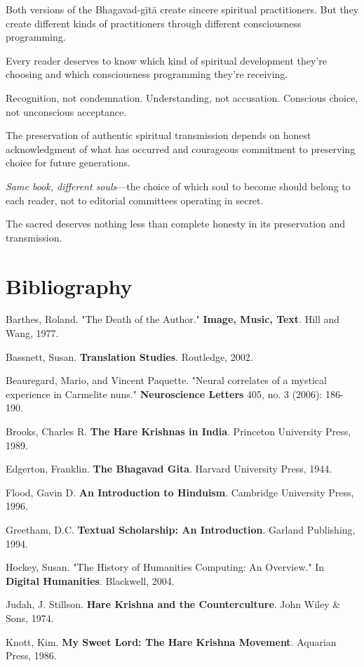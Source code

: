 \documentclass[11pt,twoside]{book}
\begin{document}
Both versions of the Bhagavad-gītā create sincere spiritual practitioners. But they create different kinds of practitioners through different consciousness programming.

Every reader deserves to know which kind of spiritual development they're choosing and which consciousness programming they're receiving.

Recognition, not condemnation. Understanding, not accusation. Conscious choice, not unconscious acceptance.

The preservation of authentic spiritual transmission depends on honest acknowledgment of what has occurred and courageous commitment to preserving choice for future generations.

\textit{Same book, different souls}—the choice of which soul to become should belong to each reader, not to editorial committees operating in secret.

The sacred deserves nothing less than complete honesty in its preservation and transmission.
\part*{Bibliography}
\label{sec:org284cc84}
\thispagestyle{plain}

Barthes, Roland. "The Death of the Author." \textbf{Image, Music, Text}. Hill and Wang, 1977.

Bassnett, Susan. \textbf{Translation Studies}. Routledge, 2002.

Beauregard, Mario, and Vincent Paquette. "Neural correlates of a mystical experience in Carmelite nuns." \textbf{Neuroscience Letters} 405, no. 3 (2006): 186-190.

Brooks, Charles R. \textbf{The Hare Krishnas in India}. Princeton University Press, 1989.

Edgerton, Franklin. \textbf{The Bhagavad Gita}. Harvard University Press, 1944.

Flood, Gavin D. \textbf{An Introduction to Hinduism}. Cambridge University Press, 1996.

Greetham, D.C. \textbf{Textual Scholarship: An Introduction}. Garland Publishing, 1994.

Hockey, Susan. "The History of Humanities Computing: An Overview." In \textbf{Digital Humanities}. Blackwell, 2004.

Judah, J. Stillson. \textbf{Hare Krishna and the Counterculture}. John Wiley \& Sons, 1974.

Knott, Kim. \textbf{My Sweet Lord: The Hare Krishna Movement}. Aquarian Press, 1986.
\end{document}
